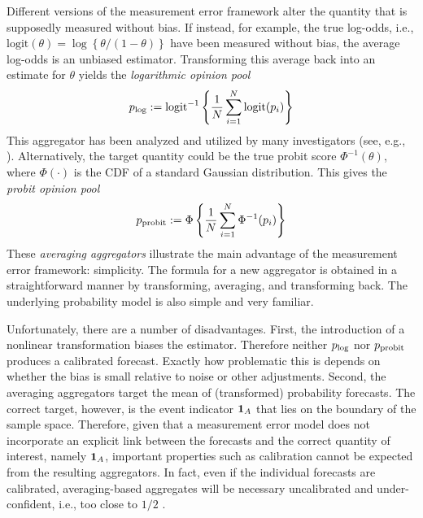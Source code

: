 \documentclass[12pt]{article}
\theoremstyle{definition}
\theoremstyle{definition}
\def\one{{\bf 1}}
\def\probit{p_{\rm probit}}
\def\logit{\text{logit}}
\def\plog{p_{\rm log}}
\begin{document}
Different versions of the measurement error framework alter the quantity that is supposedly
measured without bias. If instead, for example, the true log-odds, i.e., 
$\logit(\theta) = \log\left\{\theta/(1-\theta)\right\}$ have been measured without
bias, the average log-odds is an unbiased estimator. Transforming
this average back into an estimate for $\theta$ yields the {\em
logarithmic opinion pool}
$$\plog := \logit^{-1} \left\{ \frac{1}{N} \sum_{i=1}^N \logit
   (p_i) \right \} $$
 This aggregator has been analyzed and utilized by many
investigators (see, e.g., \citealt{dawid1995coherent, Genest,
bacharach1975group}). Alternatively, the target quantity could be
the true probit score $\Phi^{-1}(\theta)$, where $\Phi(\cdot)$ is the CDF of a standard Gaussian
distribution. This gives the {\em probit opinion pool}
$$\probit := \Phi \left\{ \frac{1}{N} \sum_{i=1}^N \Phi^{-1}
   (p_i) \right \} $$
These \textit{averaging aggregators} illustrate the main advantage of the measurement
error framework: simplicity.  The formula for a new aggregator is
obtained in a straightforward manner by transforming, averaging, and
transforming back.  The underlying probability model is also simple
and very familiar.  

Unfortunately, there are a number of disadvantages. First, the introduction of a nonlinear transformation biases the
estimator.  Therefore neither $\plog$ nor $\probit$ produces a
calibrated forecast. Exactly how problematic this is depends on
whether the bias is small relative to noise or other
adjustments. Second, the averaging aggregators target the mean of
(transformed) probability forecasts. The correct target,
however, is the event indicator $\one_A$ that lies on the boundary of
the sample space. Therefore, given that a measurement error model does not incorporate an explicit link between the forecasts and the correct quantity of interest, namely $\one_A$, important properties such as calibration cannot be expected from the resulting aggregators. In fact, even if the individual forecasts are calibrated, averaging-based aggregates will be necessary uncalibrated and under-confident, i.e., too close to $1/2$ \citep{Ranjan08}.
\end{document}
